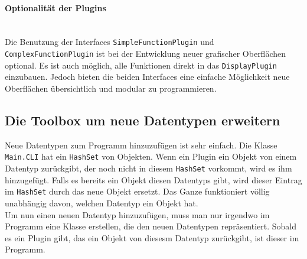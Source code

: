 \paragraph{Optionalität der Plugins}\ \\
Die Benutzung der Interfaces \lstinline[columns=fixed]{SimpleFunctionPlugin} und \lstinline[columns=fixed]{ComplexFunctionPlugin} ist bei der Entwicklung neuer grafischer Oberflächen optional. Es ist auch möglich, alle Funktionen direkt in das \lstinline[columns=fixed]{DisplayPlugin} einzubauen. Jedoch bieten die beiden Interfaces eine einfache Möglichkeit neue Oberflächen übersichtlich und modular zu programmieren.
\subsection{Die Toolbox um neue Datentypen erweitern}
\label{sec:3.4}
Neue Datentypen zum Programm hinzuzufügen ist sehr einfach. Die Klasse \lstinline[columns=fixed]{Main.CLI} hat ein \lstinline[columns=fixed]{HashSet} von Objekten. Wenn ein Plugin ein Objekt von einem Datentyp zurückgibt, der noch nicht in diesem \lstinline[columns=fixed]{HashSet} vorkommt, wird es ihm hinzugefügt. Falls es bereits ein Objekt diesen Datentyps gibt, wird dieser Eintrag im \lstinline[columns=fixed]{HashSet} durch das neue Objekt ersetzt. Das Ganze funktioniert völlig unabhängig davon, welchen Datentyp ein Objekt hat.\\
Um nun einen neuen Datentyp hinzuzufügen, muss man nur irgendwo im Programm eine Klasse erstellen, die den neuen Datentypen repräsentiert. Sobald es ein Plugin gibt, das ein Objekt von diesesm Datentyp zurückgibt, ist dieser im Programm.